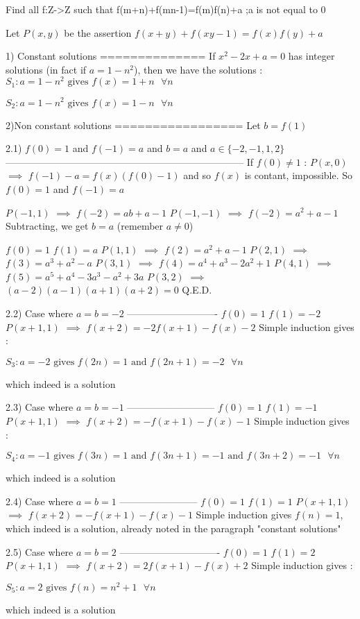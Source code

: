 \begin{solution}
	\begin{tcolorbox}Find all f:Z->Z such that
f(m+n)+f(mn-1)=f(m)f(n)+a ;a is not equal to 0\end{tcolorbox}
Let $P(x,y)$ be the assertion $f(x+y)+f(xy-1)=f(x)f(y)+a$

1) Constant solutions
==============
If $x^2-2x+a=0$ has integer solutions (in fact if $a=1-n^2$), then we have the solutions :
$\boxed{S_1 : a=1-n^2\text{ gives }f(x)=1+n\text{  }\forall n}$

$\boxed{S_2 : a=1-n^2\text{ gives }f(x)=1-n\text{  }\forall n}$

2)Non constant solutions
=================
Let $b=f(1)$

2.1) $f(0)=1$ and $f(-1)=a$ and $b=a$ and $a\in\{-2,-1,1,2\}$
--------------------------------------------------------------------------
If $f(0)\ne 1$ : $P(x,0)$ $\implies$ $f(-1)-a=f(x)(f(0)-1)$ and so $f(x)$ is contant, impossible. So $f(0)=1$ and $f(-1)=a$

$P(-1,1)$ $\implies$  $f(-2)=ab+a-1$
$P(-1,-1)$ $\implies$  $f(-2)=a^2+a-1$
Subtracting, we get $b=a$ (remember $a\ne 0$)

$f(0)=1$
$f(1)=a$
$P(1,1)$ $\implies$ $f(2)=a^2+a-1$
$P(2,1)$ $\implies$ $f(3)=a^3+a^2-a$
$P(3,1)$ $\implies$ $f(4)=a^4+a^3-2a^2+1$
$P(4,1)$ $\implies$ $f(5)=a^5+a^4-3a^3-a^2+3a$
$P(3,2)$ $\implies$ $(a-2)(a-1)(a+1)(a+2)=0$
Q.E.D.

2.2) Case where $a=b=-2$ 
----------------------------
$f(0)=1$
$f(1)=-2$
$P(x+1,1)$ $\implies$ $f(x+2)=-2f(x+1)-f(x)-2$
Simple induction gives :

$\boxed{S_3 : a=-2\text{ gives }f(2n)=1\text{  and }f(2n+1)=-2\text{  }\forall n}$

which indeed is a solution

2.3) Case where $a=b=-1$ 
---------------------------
$f(0)=1$
$f(1)=-1$
$P(x+1,1)$ $\implies$ $f(x+2)=-f(x+1)-f(x)-1$
Simple induction gives :

$\boxed{S_4 : a=-1\text{ gives }f(3n)=1\text{  and }f(3n+1)=-1\text{  and }f(3n+2)=-1\text{  }\forall n}$

which indeed is a solution

2.4) Case where $a=b=1$ 
------------------------
$f(0)=1$
$f(1)=1$
$P(x+1,1)$ $\implies$ $f(x+2)=-f(x+1)-f(x)-1$
Simple induction gives $f(n)=1$, which indeed is a solution, already noted in the paragraph "constant solutions"

2.5) Case where $a=b=2$ 
-------------------------------
$f(0)=1$
$f(1)=2$
$P(x+1,1)$ $\implies$ $f(x+2)=2f(x+1)-f(x)+2$
Simple induction gives :

$\boxed{S_5 : a=2\text{ gives }f(n)=n^2+1\text{  }\forall n}$

which indeed is a solution
\end{solution}



